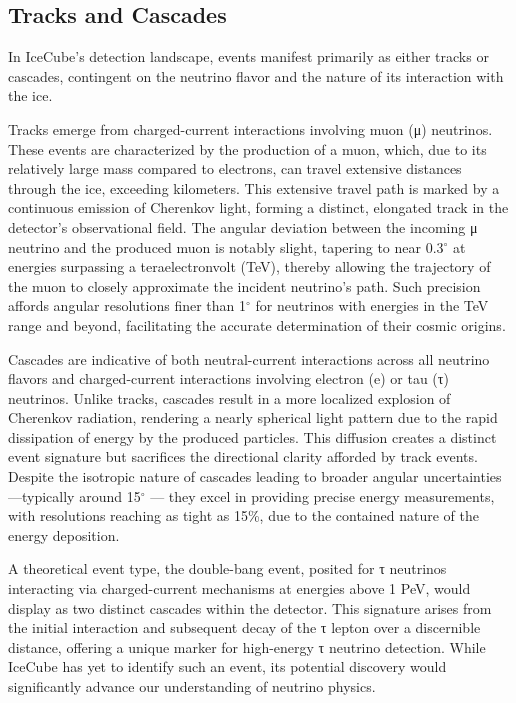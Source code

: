 \subsection{Tracks and Cascades}


In IceCube's detection landscape, events manifest primarily as either tracks or cascades, contingent on the neutrino flavor and the nature of its interaction with the ice.

Tracks emerge from charged-current interactions involving muon (μ) neutrinos.
These events are characterized by the production of a muon, which, due to its relatively large mass compared to electrons, can travel extensive distances through the ice, exceeding kilometers.
This extensive travel path is marked by a continuous emission of Cherenkov light, forming a distinct, elongated track in the detector's observational field.
The angular deviation between the incoming μ neutrino and the produced muon is notably slight, tapering to near 0.3$^\circ$ at energies surpassing a teraelectronvolt (TeV), thereby allowing the trajectory of the muon to closely approximate the incident neutrino's path.
Such precision affords angular resolutions finer than 1$^\circ$ for neutrinos with energies in the TeV range and beyond, facilitating the accurate determination of their cosmic origins.

Cascades are indicative of both neutral-current interactions across all neutrino flavors and charged-current interactions involving electron (e) or tau (τ) neutrinos.
Unlike tracks, cascades result in a more localized explosion of Cherenkov radiation, rendering a nearly spherical light pattern due to the rapid dissipation of energy by the produced particles.
This diffusion creates a distinct event signature but sacrifices the directional clarity afforded by track events.
Despite the isotropic nature of cascades leading to broader angular uncertainties—typically around 15$^\circ$ — they excel in providing precise energy measurements, with resolutions reaching as tight as 15\%, due to the contained nature of the energy deposition.

A theoretical event type, the double-bang event, posited for τ neutrinos interacting via charged-current mechanisms at energies above 1 PeV, would display as two distinct cascades within the detector.
This signature arises from the initial interaction and subsequent decay of the τ lepton over a discernible distance, offering a unique marker for high-energy τ neutrino detection.
While IceCube has yet to identify such an event, its potential discovery would significantly advance our understanding of neutrino physics.

